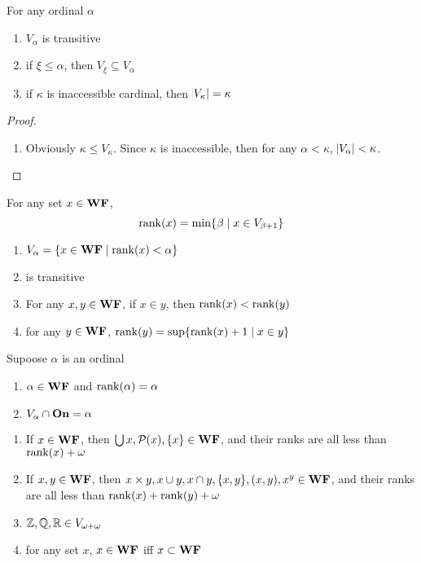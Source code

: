 \documentclass[11pt]{article}
\begin{document}
\begin{lemma}[]
For any ordinal \(\alpha\)
\begin{enumerate}
\item \(V_\alpha\) is transitive
\item if \(\xi\le\alpha\), then \(V_\xi\subseteq V_\alpha\)
\item if \(\kappa\) is inaccessible cardinal, then \(\abs{V_\kappa}=\kappa\)
\end{enumerate}
\end{lemma}

\begin{proof}
\begin{enumerate}
\item Obviously \(\kappa\le V_\kappa\). Since \(\kappa\) is inaccessible, then for any
\(\alpha<\kappa\), \(\abs{V_\alpha}<\kappa\).
\end{enumerate}
\end{proof}

\begin{definition}[]
For any set \(x\in\textbf{WF}\), 
\begin{equation*}
\mathrm{rank}{(x)}=\min\{\beta\mid x\in V_{\beta+1}\}
\end{equation*}
\end{definition}

\begin{lemma}[]
\begin{enumerate}
\item \(V_\alpha=\{x\in\textbf{WF}\mid\mathrm{rank}{(x)}<\alpha\}\)
\item \wf is transitive
\item For any \(x,y\in\textbf{WF}\), if \(x\in y\), then \(\mathrm{rank}{(x)}<\mathrm{rank}{(y)}\)
\item for any \(y\in\textbf{WF}\), \(\mathrm{rank}{(y)}=\sup\{\mathrm{rank}{(x)}+1\mid x\in y\}\)
\end{enumerate}
\end{lemma}

\begin{lemma}[]
Supoose \(\alpha\) is an ordinal
\begin{enumerate}
\item \(\alpha\in\textbf{WF}\) and \(\mathrm{rank}{(\alpha)}=\alpha\)
\item \(V_\alpha\cap\textbf{On}=\alpha\)
\end{enumerate}
\end{lemma}

\begin{lemma}[]
\begin{enumerate}
\item If \(x\in\textbf{WF}\), then \(\bigcup x,\mathcal{P}(x),\{x\}\in\textbf{WF}\), and their ranks are
all less than \(\mathrm{rank}{(x)}+\omega\)
\item If \(x,y\in\textbf{WF}\), then \(x\times y,x\cup y,x\cap y,\{x,y\},(x,y),x^y\in\textbf{WF}\),
and their ranks are all less than \(\mathrm{rank}{(x)}+\mathrm{rank}{(y)}+\omega\)
\item \(\mathbb{Z},\mathbb{Q},\mathbb{R}\in V_{\omega+\omega}\)
\item for any set \(x\), \(x\in\textbf{WF}\) iff \(x\subset\textbf{WF}\)
\end{enumerate}
\end{lemma}
\end{document}
